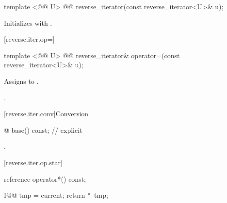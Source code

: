 %

\begin{itemdecl}
template <@@ U>
  @@
reverse_iterator(const reverse_iterator<U>& u);
\end{itemdecl}

\begin{itemdescr}
\pnum
\effects
Initializes
with
.
\end{itemdescr}

[reverse.iter.op=]{}

%
\begin{itemdecl}
template <@@ U>
  @@
reverse_iterator&
  operator=(const reverse_iterator<U>& u);
\end{itemdecl}

\begin{itemdescr}
\pnum
\effects
Assigns  to .

\pnum
\returns
{}.
\end{itemdescr}

[reverse.iter.conv]{Conversion}

%
%
\begin{itemdecl}
@ base() const;          // explicit
\end{itemdecl}

\begin{itemdescr}
\pnum
\returns
{}.
\end{itemdescr}

[reverse.iter.op.star]{}

%
\begin{itemdecl}
reference operator*() const;
\end{itemdecl}

\begin{itemdescr}
\pnum
\effects
\begin{codeblock}
I@@ tmp = current;
return *--tmp;
\end{codeblock}

\end{itemdescr}

